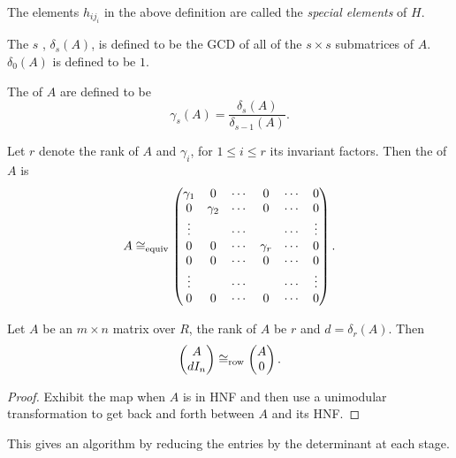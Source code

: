 The elements $h_{i j_i}$ in the above definition are called the {\em
special elements} of $H$.

\begin{definition}
The $s$\th{} , $\delta_s(A)$, is defined
to be the GCD of all of the $s\times s$ submatrices of $A$.
$\delta_0(A)$ is defined to be $1$.
\end{definition}

\begin{definition}
The  of $A$ are defined to be
\[
\gamma_s(A) = \frac{\delta_s(A)}{\delta_{s-1}(A)}.
\]
\end{definition}

\begin{definition}
Let $r$ denote the rank of $A$ and $\gamma_i$, for $1 \le i \le r$ its
invariant factors.  Then the  of $A$ is
\[
A \cong_{\rm equiv} 
  \begin{pmatrix}
      \gamma_1 & 0 & \cdots &0 &\cdots &0\cr 
      0 & \gamma_2& \cdots & 0 &\cdots &0\cr 
      \vdots & & \cdots &  &\cdots &\vdots\cr
      0 & 0 & \cdots & \gamma_r& \cdots & 0 \cr 
      0 & 0 & \cdots & 0 & \cdots & 0 \cr 
      \vdots & & \cdots &  &\cdots &\vdots\cr
      0 & 0 & \cdots & 0 & \cdots & 0 \cr
  \end{pmatrix}.
\]
\end{definition}


\begin{proposition}
Let $A$ be an $m \times n$ matrix over $R$, the rank of $A$ be
$r$ and $d = \delta_r(A)$.  Then 
\[
\begin{pmatrix} A \cr dI_n\cr \end{pmatrix}
  \cong_{\rm row} \begin{pmatrix} A \cr 0 \cr \end{pmatrix}.
\]
\end{proposition}

\begin{proof}
Exhibit the map when $A$ is in HNF and then use a unimodular
transformation to get back and forth between $A$ and its HNF.
\end{proof}


This gives an algorithm by reducing the entries by the determinant at
each stage.
